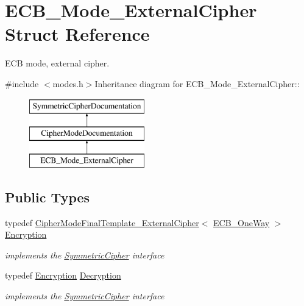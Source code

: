 \hypertarget{struct_e_c_b___mode___external_cipher}{
\section{ECB\_\-Mode\_\-ExternalCipher Struct Reference}
\label{struct_e_c_b___mode___external_cipher}
}


ECB mode, external cipher.  


{\ttfamily \#include $<$modes.h$>$}Inheritance diagram for ECB\_\-Mode\_\-ExternalCipher::\begin{figure}[H]
\begin{center}
\leavevmode
\includegraphics[height=3cm]{struct_e_c_b___mode___external_cipher}
\end{center}
\end{figure}
\subsection*{Public Types}
\begin{DoxyCompactItemize}
\item 
\hypertarget{struct_e_c_b___mode___external_cipher_ae8a34d40b7d0c1fb0b529c956ae6842b}{
typedef \hyperlink{class_cipher_mode_final_template___external_cipher}{CipherModeFinalTemplate\_\-ExternalCipher}$<$ \hyperlink{class_e_c_b___one_way}{ECB\_\-OneWay} $>$ \hyperlink{struct_e_c_b___mode___external_cipher_ae8a34d40b7d0c1fb0b529c956ae6842b}{Encryption}}
\label{struct_e_c_b___mode___external_cipher_ae8a34d40b7d0c1fb0b529c956ae6842b}

\begin{DoxyCompactList}\small\item\em implements the \hyperlink{class_symmetric_cipher}{SymmetricCipher} interface \item\end{DoxyCompactList}\item 
\hypertarget{struct_e_c_b___mode___external_cipher_a85e46f55e4cf4d2d0159ccbea4ec410c}{
typedef \hyperlink{class_cipher_mode_final_template___external_cipher}{Encryption} \hyperlink{struct_e_c_b___mode___external_cipher_a85e46f55e4cf4d2d0159ccbea4ec410c}{Decryption}}
\label{struct_e_c_b___mode___external_cipher_a85e46f55e4cf4d2d0159ccbea4ec410c}

\begin{DoxyCompactList}\small\item\em implements the \hyperlink{class_symmetric_cipher}{SymmetricCipher} interface \item\end{DoxyCompactList}\end{DoxyCompactItemize}


